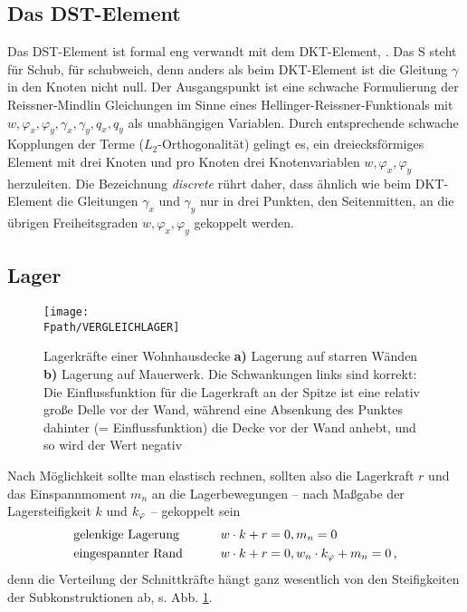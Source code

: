 {\textcolor{sectionTitleBlue}{\subsection{Das DST-Element}}}\label{DST-Element}
Das DST-Element ist formal eng verwandt mit dem DKT-Element, \cite{Batoz3}. Das S steht f\"{u}r Schub, f\"{u}r schubweich, denn anders als beim DKT-Element ist die Gleitung $\gamma$ in den Knoten nicht null. Der Ausgangspunkt ist eine schwache Formulierung der Reissner-Mindlin Gleichungen im Sinne eines Hellinger-Reissner-Funktionals mit $w, \varphi_x, \varphi_y, \gamma_x, \gamma_y, q_x, q_y$ als unabh\"{a}ngigen Variablen. Durch entsprechende schwache Kopplungen der Terme ($L_2$-Orthogonalit\"{a}t) gelingt es, ein dreiecksf\"{o}rmiges Element mit drei Knoten und pro Knoten drei Knotenvariablen $w, \varphi_x, \varphi_y$ herzuleiten. Die Bezeichnung {\em discrete\/} r\"{u}hrt daher, dass \"{a}hnlich wie beim DKT-Element die Gleitungen $\gamma_x$ und $\gamma_y$ nur in drei Punkten, den Seitenmitten, an die \"{u}brigen Freiheitsgraden $w, \varphi_x,\varphi_y$ gekoppelt werden.

{\textcolor{sectionTitleBlue}{\section{Lager}\label{Lager}}}
\begin{figure}[tbp]
\centering
\if {} \sidecaption \fi
\texttt{[image: \\Fpath/VERGLEICHLAGER]}
\caption{Lagerkr\"{a}fte einer Wohnhausdecke {\bf a)} Lagerung auf starren W\"{a}nden {\bf b)} Lagerung auf
Mauerwerk. Die Schwankungen links sind korrekt: Die Einflussfunktion f\"{u}r die Lagerkraft an der Spitze ist eine relativ gro{\ss}e Delle vor der Wand, w\"{a}hrend eine Absenkung des Punktes dahinter (= Einflussfunktion) die Decke vor der Wand anhebt, und so wird der Wert negativ }\label{VergleichLager}
\end{figure}%
Nach M\"{o}glichkeit sollte man elastisch rechnen, sollten also die Lagerkraft $r$ und das Einspannmoment $m_n$ an die Lagerbewegungen -- nach Ma{\ss}gabe der Lagersteifigkeit $k$ und $k_\varphi$ -- gekoppelt sein
\begin{alignat}{2}
&\mbox{gelenkige Lagerung} &\qquad &  w \cdot k + r = 0, m_n = 0 \nonumber \\
&\mbox{eingespannter Rand} &\qquad & w \cdot k + r = 0, w_n \cdot k_\varphi + m_n = 0\,,
\end{alignat}
denn die Verteilung der Schnittkr\"{a}fte h\"{a}ngt ganz wesentlich von den Steifig\-keiten der Subkonstruktionen ab, s. Abb. \ref{VergleichLager}.

